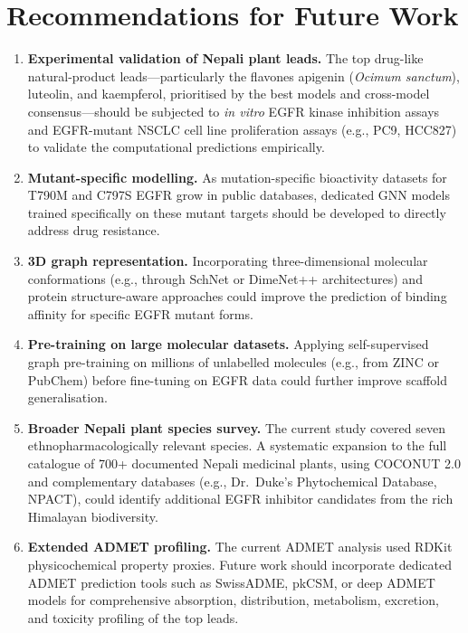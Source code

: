 \section{Recommendations for Future Work}

\begin{enumerate}
    \item \textbf{Experimental validation of Nepali plant leads.} The top drug-like
          natural-product leads---particularly the flavones apigenin
          (\textit{Ocimum sanctum}), luteolin, and kaempferol, prioritised by the best
          models and cross-model consensus---should be subjected to
          \textit{in vitro} EGFR kinase inhibition assays and EGFR-mutant NSCLC cell
          line proliferation assays (e.g., PC9, HCC827) to validate the computational
          predictions empirically.

    \item \textbf{Mutant-specific modelling.} As mutation-specific bioactivity datasets
          for T790M and C797S EGFR grow in public databases, dedicated GNN models trained
          specifically on these mutant targets should be developed to directly address
          drug resistance.

    \item \textbf{3D graph representation.} Incorporating three-dimensional molecular
          conformations (e.g., through SchNet or DimeNet++ architectures) and protein
          structure-aware approaches could improve the prediction of binding affinity
          for specific EGFR mutant forms.

    \item \textbf{Pre-training on large molecular datasets.} Applying self-supervised
          graph pre-training on millions of unlabelled molecules (e.g., from ZINC or
          PubChem) before fine-tuning on EGFR data could further improve scaffold
          generalisation.

    \item \textbf{Broader Nepali plant species survey.} The current study covered
          seven ethnopharmacologically relevant species. A systematic expansion to the
          full catalogue of 700+ documented Nepali medicinal plants, using COCONUT 2.0
          and complementary databases (e.g., Dr.\ Duke's Phytochemical Database, NPACT),
          could identify additional EGFR inhibitor candidates from the rich Himalayan
          biodiversity.

    \item \textbf{Extended ADMET profiling.} The current ADMET analysis used RDKit
          physicochemical property proxies. Future work should incorporate dedicated
          ADMET prediction tools such as SwissADME, pkCSM, or deep ADMET models for
          comprehensive absorption, distribution, metabolism, excretion, and toxicity
          profiling of the top leads.


\end{enumerate}
